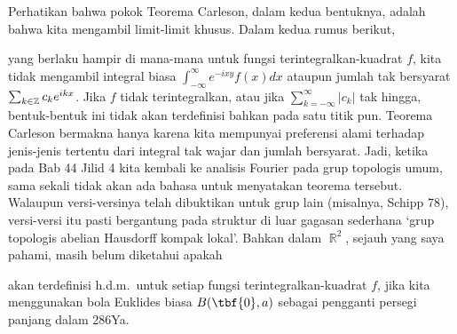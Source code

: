 {Perhatikan bahwa pokok Teorema Carleson, dalam kedua bentuknya, adalah bahwa
kita mengambil limit-limit khusus. Dalam kedua rumus berikut,



\ifdim\pagewidth>467pt\tenrmstretch{3pt}\fi
\noindent yang berlaku hampir di mana-mana untuk fungsi terintegralkan-kuadrat $f$,
kita tidak mengambil integral biasa
$\int_{-\infty}^{\infty}e^{-ixy}f(x)dx$ ataupun jumlah tak bersyarat
$\sum_{k\in\Bbb Z}c_ke^{ikx}$. Jika $f$ tidak terintegralkan, atau jika
$\sum_{k=-\infty}^{\infty}|c_k|$ tak hingga, bentuk-bentuk ini tidak akan terdefinisi
bahkan pada satu titik pun.
Teorema Carleson bermakna hanya karena kita mempunyai preferensi alami
terhadap jenis-jenis tertentu dari integral tak wajar dan jumlah bersyarat.
Jadi, ketika pada Bab 44 Jilid 4 kita kembali ke analisis Fourier pada grup
topologis umum, sama sekali tidak akan ada bahasa untuk menyatakan teorema
tersebut. Walaupun versi-versinya telah dibuktikan untuk grup lain (misalnya,
{\smc Schipp 78}),
versi-versi itu pasti bergantung pada struktur di luar gagasan sederhana
`grup topologis abelian Hausdorff kompak lokal'. Bahkan dalam
$\BbbR^2$, sejauh yang saya pahami, masih belum diketahui apakah
\tenrmstretch{1.67pt}


\noindent akan terdefinisi h.d.m.\ untuk setiap fungsi terintegralkan-kuadrat $f$,
jika kita menggunakan bola Euklides biasa $B(\tbf{0},a)$ sebagai pengganti
persegi panjang dalam 286Ya.
}%

\frnewpage
